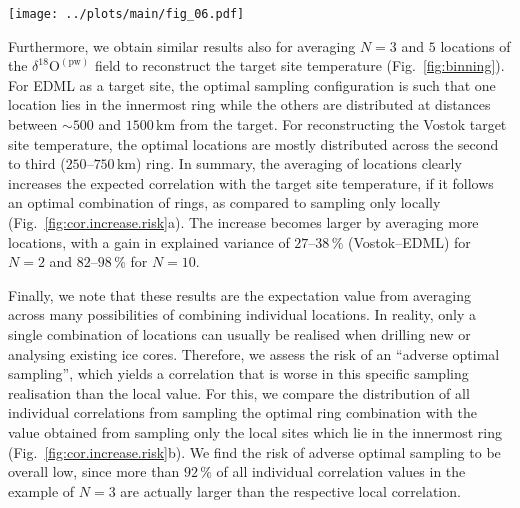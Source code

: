 \documentclass[cp, manuscript]{copernicus}
\begin{document}
\begin{figure*}[t]%
\centering
\texttt{[image: ../plots/main/fig\_06.pdf]}
\caption{%
  The optimal arrangement for averaging three or five
  $\delta^{18}\mathrm{O}^{\mathrm{(pw)}}$ ice cores to reconstruct the target
  site temperature at the EDML (\textbf{a}, \textbf{c}) and Vostok (\textbf{b},
  \textbf{d}) drilling sites. Displayed are subsets of the sampling correlation
  structures for $N=3$ and $5$, showing the optimal five of all possible
  combinations of rings, i.e. those which exhibit the highest mean correlation
  across $10^5$ random trials of averaging $N=3$ (\textbf{c}, \textbf{d}) or
  $N=5$ (\textbf{a}, \textbf{b}) grid cells from these rings.}
\label{fig:binning}%
\end{figure*}%

Furthermore, we obtain similar results also for averaging $N=3$ and $5$
locations of the $\delta^{18}\mathrm{O}^{\mathrm{(pw)}}$ field to reconstruct
the target site temperature (Fig.~\ref{fig:binning}). For EDML as a target site,
the optimal sampling configuration is such that one location lies in the
innermost ring while the others are distributed at distances between $\sim500$
and $1500$\,km from the target. For reconstructing the Vostok target site
temperature, the optimal locations are mostly distributed across the second to
third ($250$--$750$\,km) ring. In summary, the averaging of locations clearly
increases the expected correlation with the target site temperature, if it
follows an optimal combination of rings, as compared to sampling only locally
(Fig.~\ref{fig:cor.increase.risk}a). The increase becomes larger by averaging
more locations, with a gain in explained variance of $27$--$38\,\%$
(Vostok--EDML) for $N=2$ and $82$--$98\,\%$ for $N=10$.

Finally, we note that these results are the expectation value from averaging
across many possibilities of combining individual locations. In reality, only a
single combination of locations can usually be realised when drilling new or
analysing existing ice cores. Therefore, we assess the risk of an ``adverse
optimal sampling'', which yields a correlation that is worse in this specific
sampling realisation than the local value. For this, we compare the distribution
of all individual correlations from sampling the optimal ring combination with
the value obtained from sampling only the local sites which lie in the innermost
ring (Fig.~\ref{fig:cor.increase.risk}b). We find the risk of adverse optimal
sampling to be overall low, since more than $92\,\%$ of all individual
correlation values in the example of $N=3$ are actually larger than the
respective local correlation.
\end{document}
